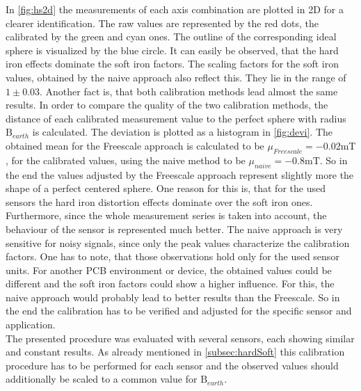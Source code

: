In \ref{fig:hs2d} the measurements of each axis combination are plotted in 2D for a clearer identification. The raw values are represented by the red dots, the calibrated by the green and cyan ones. The outline of the corresponding ideal sphere is visualized by the blue circle. It can easily be observed, that the hard iron effects dominate the soft iron factors. The scaling factors for the soft iron values, obtained by the naive approach also reflect this. They lie in the range of $ 1 \pm 0.03 $. Another fact is, that both calibration methods lead almost the same results. In order to compare the quality of the two calibration methods, the distance of each calibrated measurement value to the perfect sphere with radius $ \mathrm{B}_{earth} $ is calculated. The deviation is plotted as a histogram in \ref{fig:devi}. The obtained mean for the Freescale approach is calculated to be $ \mu_{Freescale} = -0.02\si{\milli \tesla} $, for the calibrated values, using the naive method to be $ \mu_{naive} = -0.8\si{\milli \tesla} $. So in the end the values adjusted by the Freescale approach represent slightly more the shape of a perfect centered sphere. One reason for this is, that for the used sensors the hard iron distortion effects dominate over the soft iron ones. Furthermore, since the whole measurement series is taken into account, the behaviour of the sensor is represented much better. The naive approach is very sensitive for noisy signals, since only the peak values characterize the calibration factors. One has to note, that those observations hold only for the used sensor units. For another \ac{PCB} environment or device, the obtained values could be different and the soft iron factors could show a higher influence. For this, the naive approach would probably lead to better results than the Freescale. So in the end the calibration has to be verified and adjusted for the specific sensor and application.\\
The presented procedure was evaluated with several sensors, each showing similar and constant results. As already mentioned in \ref{subsec:hardSoft} this calibration procedure has to be performed for each sensor and the observed values should additionally be scaled to a common value for $ \mathrm{B}_{earth} $.
